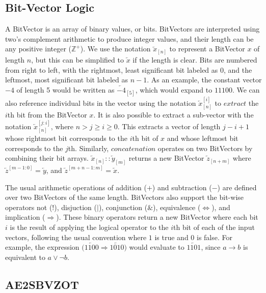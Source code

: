 \documentclass[a4paper,12pt]{article}
\newcommand*\BitAnd{\mathbin{\&}}
\newcommand*\BitOr{\mathbin{|}}
\newcommand{\BitNeg}{!}
\begin{document}
\subsection{Bit-Vector Logic}\label{bvlogic}
A BitVector is an array of binary values, or bits. BitVectors are interpreted
using two's complement arithmetic to produce integer values, and their length
can be any positive integer (\(\mathbb{Z}^+\)). We use the notation
\(\overleftarrow{x}_{[n]}\) to represent a BitVector \(x\) of length \(n\), but
this can be simplified to \(\overleftarrow{x}\) if the length is clear. Bits are
numbered from right to left, with the rightmost, least significant bit labeled
as 0, and the leftmost, most significant bit labeled as \(n-1\). As an example,
the constant vector \(-4\) of length 5 would be written as
\(\overleftarrow{-4}_{[5]}\), which would expand to \(11100\). We can also
reference individual bits in the vector using the notation
\(\overleftarrow{x}_{[n]}^{[i]}\) to \(extract\) the \(i\)th bit from the
BitVector \(x\). It is also possible to extract a sub-vector with the notation
\(\overleftarrow{x}_{[n]}^{[j:i]}\), where \(n>j\geq i\geq 0\). This extracts a
vector of length \(j-i+1\) whose rightmost bit corresponds to the \(i\)th bit of
\(x\) and whose leftmost bit corresponds to the \(j\)th. Similarly,
\(concatenation\) operates on two BitVectors by combining their bit arrays.
\(\overleftarrow{x}_{[n]} :: \overleftarrow{y}_{[m]}\) returns a new BitVector
\(\overleftarrow{z}_{[n+m]}\) where \(\overleftarrow{z}^{[m-1:0]} =
\overleftarrow{y}\), and \(\overleftarrow{z}^{[m+n-1:m]} = \overleftarrow{x}\).

The usual arithmetic operations of addition (\(+\)) and subtraction (\(-\)) are
defined over two BitVectors of the same length. BitVectors also support the
bit-wise operators not (\(\BitNeg\)), disjuction (\(\BitOr\)), conjunction (\(\BitAnd\)),
equivalence (\(\iff\)), and implication (\(\Rightarrow\)). These binary operators return a
new BitVector where each bit \(i\) is the result of applying the logical
operator to the \(i\)th bit of each of the input vectors, following the usual
convention where \(1\) is true and \(0\) is false. For example, the expression
\(\big( \overleftarrow{1100} \Rightarrow \overleftarrow{1010} \big) \) would
evaluate to \(\overleftarrow{1101}\), since \(a \rightarrow b\) is equivalent to
\(a \lor \neg b\).


\subsection{AE2SBVZOT}\label{zot-encoding}
\end{document}
